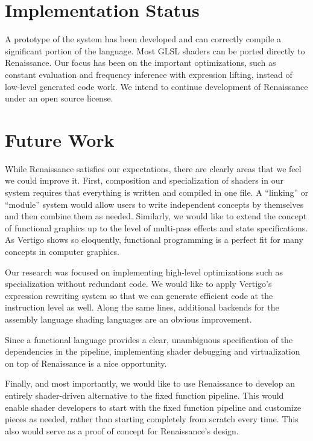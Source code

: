 \documentclass[review]{acmsiggraph}      %
\begin{document}
\section{Implementation Status}

A prototype of the system has been developed and can correctly compile
a significant portion of the language.  Most GLSL shaders can be
ported directly to Renaissance.  Our focus has been on the important
optimizations, such as constant evaluation and frequency inference with
expression lifting, instead of low-level generated code work.  We
intend to continue development of Renaissance under an open source
license.


\section{Future Work}

While Renaissance satisfies our expectations, there are clearly areas
that we feel we could improve it.  First, composition and
specialization of shaders in our system requires that everything is
written and compiled in one file.  A ``linking'' or ``module'' system
would allow users to write independent concepts by themselves and then
combine them as needed.  Similarly, we would like to extend the
concept of functional graphics up to the level of multi-pass effects
and state specifications.  As Vertigo \cite{elliott04vertigo} shows so
eloquently, functional programming is a perfect fit for many concepts
in computer graphics.

Our research was focused on implementing high-level optimizations such
as specialization without redundant code.  We would like to apply
Vertigo's expression rewriting system so that we can generate
efficient code at the instruction level as well.  Along the same
lines, additional backends for the assembly language shading languages
are an obvious improvement.

Since a functional language provides a clear, unambiguous
specification of the dependencies in the pipeline, implementing shader
debugging and virtualization on top of Renaissance is a nice
opportunity.

Finally, and most importantly, we would like to use Renaissance to
develop an entirely shader-driven alternative to the fixed function
pipeline.  This would enable shader developers to start with the fixed
function pipeline and customize pieces as needed, rather than starting
completely from scratch every time.  This also would serve as a proof
of concept for Renaissance's design.
\end{document}
